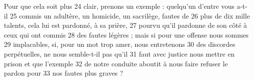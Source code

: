 Pour que cela soit plus	 
24	 	clair, prenons un exemple : quelqu'un d'entre vous a-t-il	 
25	 	commis un adultère, un homicide, un sacrilège, fautes de	 
26	 	plus de dix mille talents, cela lui est pardonné, à sa prière,	 
27	 	pourvu qu'il pardonne de son côté à ceux qui ont commis	 
28	 	des fautes légères ; mais si pour une offense nous sommes	 
29	 	implacables, si, pour un mot trop amer, nous entretenons	 
30	 	des discordes perpétuelles, ne nous semble-t-il pas qu'il	 
31	 	faut avec justice nous mettre en prison et que l'exemple	 
32	 	de notre conduite aboutit à nous faire refuser le pardon pour	 
33	 	nos fautes plus graves ?